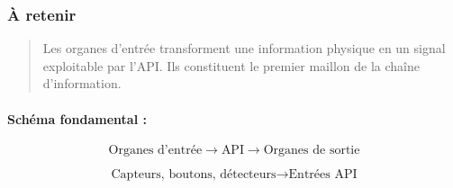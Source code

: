 \subsubsection*{À retenir}

\begin{quote}
Les organes d'entrée transforment une information physique en un signal exploitable par l'API. Ils constituent le premier maillon de la chaîne d'information.
\end{quote}

\paragraph{Schéma fondamental :}

\[
\text{Organes d'entrée} \rightarrow \text{API} \rightarrow \text{Organes de sortie}
\]

\[
\text{Capteurs, boutons, détecteurs} \rightarrow \text{Entrées API}
\]